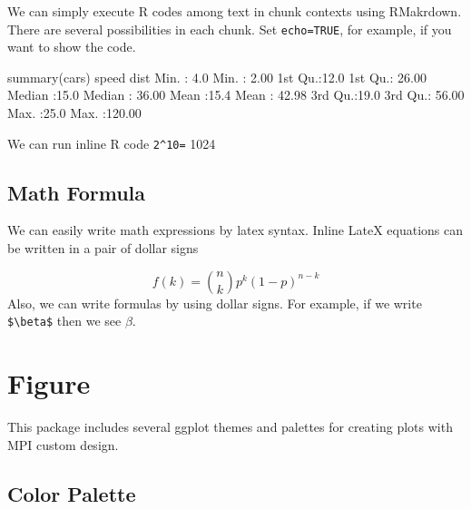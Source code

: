 \documentclass[
]{book}
\newenvironment{Shaded}{\begin{snugshade}}{\end{snugshade}}
\newcommand{\FloatTok}[1]{\textcolor[rgb]{0.00,0.00,0.81}{#1}}
\newcommand{\FunctionTok}[1]{\textcolor[rgb]{0.00,0.00,0.00}{#1}}
\newcommand{\NormalTok}[1]{#1}
\newcommand{\SpecialCharTok}[1]{\textcolor[rgb]{0.00,0.00,0.00}{#1}}
\begin{document}
We can simply execute R codes among text in chunk contexts using RMakrdown. There are several possibilities in each chunk. Set \texttt{echo=TRUE}, for example, if you want to show the code.

\begin{Shaded}
\begin{Highlighting}[]
\FunctionTok{summary}\NormalTok{(cars)}
\NormalTok{     speed           dist       }
\NormalTok{ Min.   }\SpecialCharTok{:} \FloatTok{4.0}\NormalTok{   Min.   }\SpecialCharTok{:}  \FloatTok{2.00}  
\NormalTok{ 1st Qu.}\SpecialCharTok{:}\FloatTok{12.0}\NormalTok{   1st Qu.}\SpecialCharTok{:} \FloatTok{26.00}  
\NormalTok{ Median }\SpecialCharTok{:}\FloatTok{15.0}\NormalTok{   Median }\SpecialCharTok{:} \FloatTok{36.00}  
\NormalTok{ Mean   }\SpecialCharTok{:}\FloatTok{15.4}\NormalTok{   Mean   }\SpecialCharTok{:} \FloatTok{42.98}  
\NormalTok{ 3rd Qu.}\SpecialCharTok{:}\FloatTok{19.0}\NormalTok{   3rd Qu.}\SpecialCharTok{:} \FloatTok{56.00}  
\NormalTok{ Max.   }\SpecialCharTok{:}\FloatTok{25.0}\NormalTok{   Max.   }\SpecialCharTok{:}\FloatTok{120.00}  
\end{Highlighting}
\end{Shaded}

We can run inline R code \texttt{2\^{}10=} 1024

\hypertarget{math-formula}{%
\section{Math Formula}\label{math-formula}}

We can easily write math expressions by latex syntax.
Inline LateX equations can be written in a pair of dollar signs

\[f\left(k\right)=\binom{n}{k}p^k\left(1-p\right)^{n-k}\]
Also, we can write formulas by using dollar signs. For example, if we write \texttt{\$\textbackslash{}beta\$} then we see \(\beta\).

\hypertarget{figure}{%
\chapter{Figure}\label{figure}}

This package includes several ggplot themes and palettes for creating plots with
MPI custom design.

\hypertarget{color-palette}{%
\section{Color Palette}\label{color-palette}}
\end{document}
